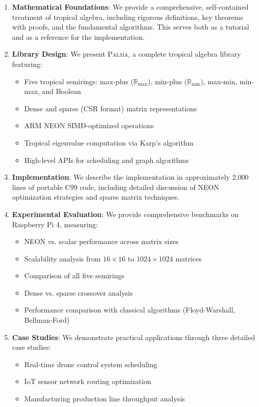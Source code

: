 \documentclass[11pt,a4paper]{article}
\theoremstyle{plain}
\theoremstyle{definition}
\newcommand{\palma}{\textsc{Palma}}
\newcommand{\Rmax}{\mathbb{R}_{\max}}
\newcommand{\Rmin}{\mathbb{R}_{\min}}
\begin{document}
\begin{enumerate}[leftmargin=*]
    \item \textbf{Mathematical Foundations}: We provide a comprehensive, self-contained treatment of tropical algebra, including rigorous definitions, key theorems with proofs, and the fundamental algorithms. This serves both as a tutorial and as a reference for the implementation.
    
    \item \textbf{Library Design}: We present \palma{}, a complete tropical algebra library featuring:
    \begin{itemize}
        \item Five tropical semirings: max-plus ($\Rmax$), min-plus ($\Rmin$), max-min, min-max, and Boolean
        \item Dense and sparse (CSR format) matrix representations
        \item ARM NEON SIMD-optimized operations
        \item Tropical eigenvalue computation via Karp's algorithm
        \item High-level APIs for scheduling and graph algorithms
    \end{itemize}
    
    \item \textbf{Implementation}: We describe the implementation in approximately 2,000 lines of portable C99 code, including detailed discussion of NEON optimization strategies and sparse matrix techniques.
    
    \item \textbf{Experimental Evaluation}: We provide comprehensive benchmarks on Raspberry Pi 4, measuring:
    \begin{itemize}
        \item NEON vs. scalar performance across matrix sizes
        \item Scalability analysis from $16 \times 16$ to $1024 \times 1024$ matrices
        \item Comparison of all five semirings
        \item Dense vs. sparse crossover analysis
        \item Performance comparison with classical algorithms (Floyd-Warshall, Bellman-Ford)
    \end{itemize}
    
    \item \textbf{Case Studies}: We demonstrate practical applications through three detailed case studies:
    \begin{itemize}
        \item Real-time drone control system scheduling
        \item IoT sensor network routing optimization
        \item Manufacturing production line throughput analysis
    \end{itemize}
\end{enumerate}
\end{document}
